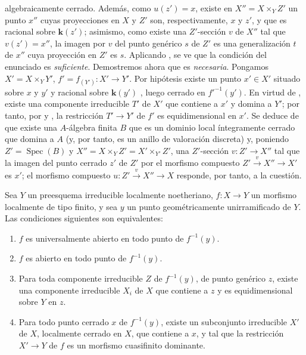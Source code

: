 algebraicamente cerrado. Además, como $u(z')=x$, existe en $X''=X\times_Y Z'$ un punto $x''$ cuyas proyecciones en $X$ y $Z'$ son, respectivamente, $x$ y $z'$, y que es racional sobre $\boldsymbol{k}(z')$; asimismo, como existe una $Z'$-sección $v$ de $X''$ tal que $v(z')=x''$, la imagen por $v$ del punto genérico $s$ de $Z'$ es una generalización $t$ de $x''$ cuya proyección en $Z'$ es $s$. Aplicando , se ve que la condición del enunciado es \emph{suficiente}.
Demostremos ahora que es \emph{necesaria}.
Pongamos $X'=X\times_Y Y'$, $f'=f_{(Y')}:X'\to Y'$.
Por hipótesis existe un punto $x'\in X'$ situado sobre $x$ y $y'$ y racional sobre $\boldsymbol{k}(y')$ , luego cerrado en $f'^{-1}(y')$.
En virtud de , existe una componente irreducible $T'$ de $X'$ que contiene a $x'$ y domina a $Y'$; por tanto, por  y , la restricción $T'\to Y'$ de $f'$ es equidimensional en $x'$.
Se deduce de  que existe una $A$-álgebra finita $B$ que es un dominio local íntegramente cerrado que domina a $A$ (y, por tanto, es un anillo de valoración discreta) y, poniendo $Z'=\operatorname{Spec}(B)$ y $X''=X\times_Y Z'=X'\times_{Y'}Z'$, una $Z'$-sección $v:Z'\to X''$ tal que la imagen del punto cerrado $z'$ de $Z'$ por el morfismo compuesto $Z'\xrightarrow{v}X''\to X'$ es $x'$; el morfismo compuesto $u:Z'\xrightarrow{v}X''\to X$ responde, por tanto, a la cuestión.

\begin{proposition}[14.5.9]
\label{IV.14.5.9}
Sea $Y$ un preesquema irreducible localmente noetheriano, $f:X\to Y$ un morfismo localmente de tipo finito, y sea $y$ un punto \textup{geométricamente unirramificado} de $Y$.
Las condiciones siguientes son equivalentes:
\begin{enumerate}[label=\emph{\alph*)}]
  \item $f$ es universalmente abierto en todo punto de $f^{-1}(y)$.
  \item $f$ es abierto en todo punto de $f^{-1}(y)$.
  \item Para toda componente irreducible $Z$ de $f^{-1}(y)$, de punto genérico $z$, existe una componente irreducible $X_i$ de $X$ que contiene a $z$ y es equidimensional sobre $Y$ en $z$.
  \item Para todo punto cerrado $x$ de $f^{-1}(y)$, existe un subconjunto irreducible $X'$ de $X$, localmente cerrado en $X$, que contiene a $x$, y tal que la restricción $X'\to Y$ de $f$ es un morfismo cuasifinito dominante.
\end{enumerate}
\end{proposition}


